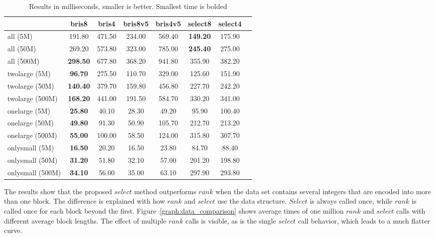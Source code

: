 \begin{table}
\centering
\caption{Results in milliseconds, smaller is better. Smallest time is bolded
\label{table:results1}}
\begin{tabular}{l||c c c c c c c} 
& bris8 & bris4 & bris8v5 & bris4v5 & select8 & select4  \\
 \hline \hline 
all (5M)   & 191.80 & 471.50 & 234.00 & 569.40 & \textbf{149.20} & 175.90 \\
all (50M)   & 269.20 & 573.80 & 323.00 & 785.00 & \textbf{245.40} & 275.00 \\
all (500M)   & \textbf{298.50} & 677.80 & 368.20 & 941.80 & 355.90 & 382.20 \\
twolarge (5M)   & \textbf{96.70} & 275.50 & 110.70 & 329.00 & 125.60 & 151.90 \\
twolarge (50M)   & \textbf{140.40} & 379.70 & 159.80 & 456.80 & 227.70 & 242.20 \\
twolarge (500M)   & \textbf{168.20} & 441.00 & 191.50 & 584.70 & 330.20 & 341.00 \\
onelarge (5M)   & \textbf{25.80} & 40.10 & 28.30 & 49.20 & 95.90 & 100.40 \\
onelarge (50M)   & \textbf{49.80} & 91.30 & 50.90 & 105.70 & 212.70 & 213.20 \\
onelarge (500M)   & \textbf{55.00} & 100.00 & 58.50 & 124.00 & 315.80 & 307.70 \\
onlysmall (5M)   & \textbf{16.50} & 20.20 & 16.50 & 23.80 & 84.70 & 88.40 \\
onlysmall (50M)   & \textbf{31.20} & 51.80 & 32.10 & 57.00 & 201.20 & 198.80 \\
onlysmall (500M)   & \textbf{34.10}  & 56.00 & 35.00 & 63.10 & 297.90 & 293.80 \\

\hline
\end{tabular}
\end{table}

The results show that the proposed $select$ method outperforms $rank$ when the data set contains several integers that are encoded into more than one block. The difference is explained 
with how $rank$ and $select$ use the data structure. $Select$ is always called once, while $rank$ is called once for each block beyond the first. Figure~\ref{graph:data_comparison} shows average times
of one million $rank$ and $select$ calls with different average block lengths. The effect of multiple $rank$ calls is visible, as is the single $select$ call behavior, which leads to a much flatter curve.


